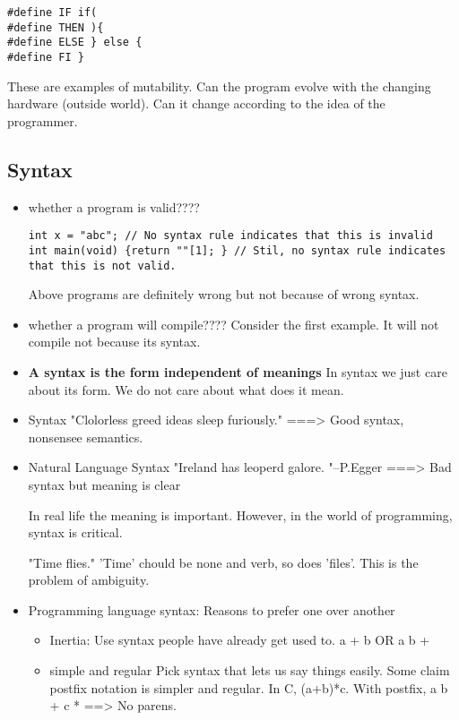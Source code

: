 \documentclass[11pt]{article}
\begin{document}
\begin{verbatim}
#define IF if(
#define THEN ){
#define ELSE } else {
#define FI }
\end{verbatim}

These are examples of mutability. Can the program evolve with the changing
hardware (outside world). Can it change according to the idea of the
programmer.

\subsection{Syntax}
\label{sec:orga024d6d}
\begin{itemize}
\item whether a program is valid????
\begin{verbatim}
int x = "abc"; // No syntax rule indicates that this is invalid
int main(void) {return ""[1]; } // Stil, no syntax rule indicates that this is not valid.
\end{verbatim}
Above programs are definitely wrong but not because of wrong syntax.

\item whether a program will compile????
Consider the first example. It will not compile not because its syntax.

\item \textbf{A syntax is the form independent of meanings}
In syntax we just care about its form. We do not care about what does it mean.

\item Syntax
"Clolorless greed ideas sleep furiously." ===> Good syntax, nonsensee
semantics.

\item Natural Language Syntax
"Ireland has leoperd galore. "--P.Egger  ===> Bad syntax but meaning is
clear

In real life the meaning is important. However, in the world of
programming, syntax is critical.

"Time flies." 'Time' chould be none and verb, so does 'files'. This is the
problem of ambiguity.

\item Programming language syntax: Reasons to prefer one over another
\begin{itemize}
\item Inertia: Use syntax people have already get used to.
a + b OR a b +

\item simple and regular
Pick syntax that lets us say things easily.
Some claim postfix notation is simpler and regular.
In C, (a+b)*c. With postfix, a b + c * ==> No parens.


\end{itemize}
\end{itemize}
\end{document}
